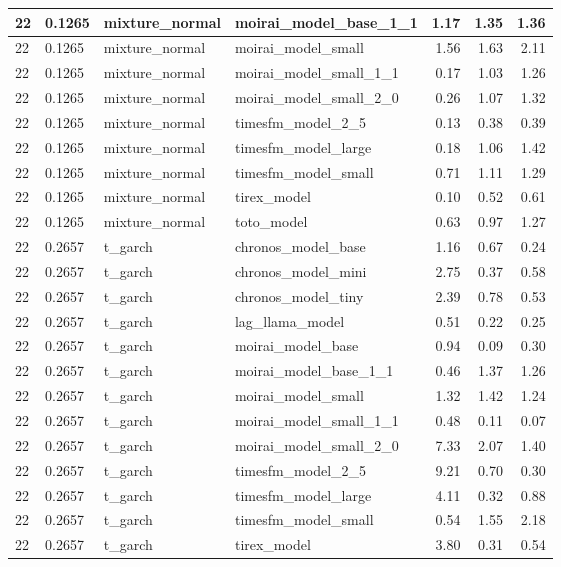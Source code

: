{\begin{tabular}{llllrrr}
\midrule
22 & 0.1265 & mixture\_normal & moirai\_model\_base\_1\_1 & 1.17 & 1.35 & 1.36 \\
\midrule
22 & 0.1265 & mixture\_normal & moirai\_model\_small & 1.56 & 1.63 & 2.11 \\
\midrule
22 & 0.1265 & mixture\_normal & moirai\_model\_small\_1\_1 & 0.17 & 1.03 & 1.26 \\
\midrule
22 & 0.1265 & mixture\_normal & moirai\_model\_small\_2\_0 & 0.26 & 1.07 & 1.32 \\
\midrule
22 & 0.1265 & mixture\_normal & timesfm\_model\_2\_5 & 0.13 & 0.38 & 0.39 \\
\midrule
22 & 0.1265 & mixture\_normal & timesfm\_model\_large & 0.18 & 1.06 & 1.42 \\
\midrule
22 & 0.1265 & mixture\_normal & timesfm\_model\_small & 0.71 & 1.11 & 1.29 \\
\midrule
22 & 0.1265 & mixture\_normal & tirex\_model & 0.10 & 0.52 & 0.61 \\
\midrule
22 & 0.1265 & mixture\_normal & toto\_model & 0.63 & 0.97 & 1.27 \\
\midrule
22 & 0.2657 & t\_garch & chronos\_model\_base & 1.16 & 0.67 & 0.24 \\
\midrule
22 & 0.2657 & t\_garch & chronos\_model\_mini & 2.75 & 0.37 & 0.58 \\
\midrule
22 & 0.2657 & t\_garch & chronos\_model\_tiny & 2.39 & 0.78 & 0.53 \\
\midrule
22 & 0.2657 & t\_garch & lag\_llama\_model & 0.51 & 0.22 & 0.25 \\
\midrule
22 & 0.2657 & t\_garch & moirai\_model\_base & 0.94 & 0.09 & 0.30 \\
\midrule
22 & 0.2657 & t\_garch & moirai\_model\_base\_1\_1 & 0.46 & 1.37 & 1.26 \\
\midrule
22 & 0.2657 & t\_garch & moirai\_model\_small & 1.32 & 1.42 & 1.24 \\
\midrule
22 & 0.2657 & t\_garch & moirai\_model\_small\_1\_1 & 0.48 & 0.11 & 0.07 \\
\midrule
22 & 0.2657 & t\_garch & moirai\_model\_small\_2\_0 & 7.33 & 2.07 & 1.40 \\
\midrule
22 & 0.2657 & t\_garch & timesfm\_model\_2\_5 & 9.21 & 0.70 & 0.30 \\
\midrule
22 & 0.2657 & t\_garch & timesfm\_model\_large & 4.11 & 0.32 & 0.88 \\
\midrule
22 & 0.2657 & t\_garch & timesfm\_model\_small & 0.54 & 1.55 & 2.18 \\
\midrule
22 & 0.2657 & t\_garch & tirex\_model & 3.80 & 0.31 & 0.54 \\

\end{tabular}}
